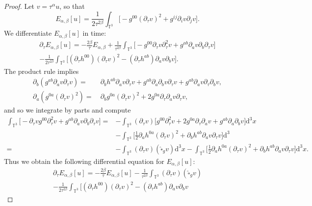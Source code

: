 \documentclass{article}
\newcommand{\TT}{\mathbb{T}}
\newcommand{\de}{\mathrm{d}}
\newcommand{\wh}{\widehat}
\newcommand{\pa}{\partial}
\begin{document}
\begin{proof}
    Let $v = \tau^{\alpha}u$, so that
    \begin{equation}
        E_{\alpha,\beta}[u] = \frac{1}{2\tau^{2\beta}}\int_{\TT^3}\Big[-g^{00}(\pa_\tau v)^2 + g^{ij}\pa_i v\pa_j v\Big].
    \end{equation}
    We differentiate $E_{\alpha,\beta}[u]$ in time:
    \begin{multline}
        \pa_\tau E_{\alpha,\beta}[u] = -\frac{2\beta}{\tau}E_{\alpha,\beta} +\frac{1}{\tau^{2\beta}}\int_{\TT^3}\Big[-g^{00}\pa_\tau v\pa_\tau^2 v + g^{ab}\pa_a v \pa_b \pa_\tau v\Big]\\
        - \frac{1}{2\tau^{2\beta}}\int_{\TT^3}\Big[(\pa_\tau h^{00})(\pa_\tau v)^2 - (\pa_\tau h^{ab})\pa_a v \pa_b v \Big].
    \end{multline}
    The product rule implies
    \begin{subequations}
        \begin{align}
            \pa_b (g^{ab}\pa_a v \pa_\tau v) =&\> \pa_b h^{ab} \pa_a v\pa_\tau v + g^{ab} \pa_a \pa_b v \pa_\tau v + g^{ab}\pa_a v \pa_\tau\pa_b v,\\
            \pa_a (g^{0a}(\pa_\tau v)^2) =&\> \pa_b g^{0a} (\pa_\tau v)^2 + 2g^{0a} \pa_\tau \pa_a v \pa_\tau v,
        \end{align}
    \end{subequations}
    and so we integrate by parts and compute
    \begin{align}
        \int_{\TT^3}\Big[ -\pa_\tau vg^{00}\pa_\tau^2 v + g^{ab}\pa_a v \pa_b \pa_\tau v\Big] =& -\int_{\TT^3}(\pa_\tau v)\Big[g^{00}\pa_\tau^2 v + 2g^{0a}\pa_\tau\pa_a v + g^{ab} \pa_a\pa_b v\Big]\de^3 x\nonumber\\
        &-\int_{\TT^3}\Big[\frac{1}{2}\pa_a h^{0a} (\pa_\tau v)^2 + \pa_b h^{ab} \pa_a v\pa_\tau v\Big]\de^3\nonumber\\
        =& -\int_{\TT^3}(\pa_\tau v)(\wh{\square}_g v)\de^3 x-\int_{\TT^3}\Big[\frac{1}{2}\pa_a h^{0a} (\pa_\tau v)^2 + \pa_b h^{ab} \pa_a v\pa_\tau v \Big]\de^3 x.
    \end{align}
    Thus we obtain the following differential equation for $E_{\alpha,\beta}[u]$:
    \begin{multline}\label{sec:energyests.eq:energyineqproof1}
        \pa_\tau E_{\alpha,\beta}[u] = -\frac{2\beta}{\tau}E_{\alpha,\beta}[u] -\frac{1}{\tau^{2\beta}}\int_{\TT^3}(\pa_\tau v)(\wh{\square}_g v)
        \\-\frac{1}{2\tau^{2\beta}}\int_{\TT^3}\Big[(\pa_\tau h^{00})(\pa_\tau v)^2 - (\pa_\tau h^{ab})\pa_a v \pa_b v

\end{multline}
\end{proof}
\end{document}
